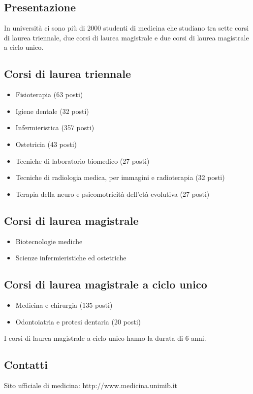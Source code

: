 
\subsection{Presentazione}
In università ci sono più di 2000 studenti di medicina che studiano tra sette corsi di laurea triennale, due corsi di laurea magistrale e due corsi di laurea magistrale a ciclo unico. 

\subsection{Corsi di laurea triennale}
\begin{itemize}
\item Fisioterapia (63 posti) 
\item Igiene dentale (32 posti) 
\item Infermieristica (357 posti) 
\item Ostetricia (43 posti) 
\item Tecniche di laboratorio biomedico (27 posti) 
\item Tecniche di radiologia medica, per immagini e radioterapia (32 posti) 
\item Terapia della neuro e psicomotricità dell'età evolutiva (27 posti) 
\end{itemize}

\subsection{Corsi di laurea magistrale}
\begin{itemize}
\item Biotecnologie mediche 
\item Scienze infermieristiche ed ostetriche
\end{itemize}

\subsection{Corsi di laurea magistrale a ciclo unico}
\begin{itemize}
\item Medicina e chirurgia (135 posti) 
\item Odontoiatria e protesi dentaria (20 posti) 
\end{itemize}
I corsi di laurea magistrale a ciclo unico hanno la durata di 6 anni. 

\subsection{Contatti}
Sito ufficiale di medicina: http://www.medicina.unimib.it 

